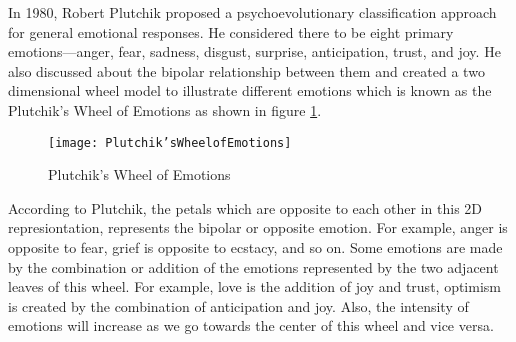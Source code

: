 In 1980, Robert Plutchik proposed a psychoevolutionary classification approach for general emotional responses. He considered there to be eight primary emotions—anger, fear, sadness, disgust, surprise, anticipation, trust, and joy. He also discussed about the bipolar relationship between them and created a two dimensional wheel model to illustrate different emotions which is known as the Plutchik's Wheel of Emotions as shown in figure \ref{Fig:fig3}.

\begin{figure}[H]
	\texttt{[image: Plutchik'sWheelofEmotions]}
	\caption{Plutchik's Wheel of Emotions}
	\label{Fig:fig3}
\end{figure}

According to Plutchik, the petals which are opposite to each other in this 2D represiontation, represents the bipolar or opposite emotion. For example, anger is opposite to fear, grief is opposite to ecstacy, and so on. Some emotions are made by the combination or addition of the emotions represented by the two adjacent leaves of this wheel. For example, love is the addition of joy and trust, optimism is created by the combination of anticipation and joy. Also, the intensity of emotions will increase as we go towards the center of this wheel and vice versa\cite{enwiki:1136521972}.